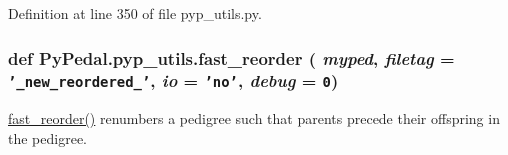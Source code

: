 Definition at line 350 of file pyp\_\-utils.py.\hypertarget{namespacePyPedal_1_1pyp__utils_2e16f737b56be8e4ab5ce5103a36644c}{
\subsubsection[fast\_\-reorder]{\setlength{\rightskip}{0pt plus 5cm}def Py\-Pedal.pyp\_\-utils.fast\_\-reorder ( {\em myped},  {\em filetag} = {\tt '\_\-new\_\-reordered\_\-'},  {\em io} = {\tt 'no'},  {\em debug} = {\tt 0})}}
\label{namespacePyPedal_1_1pyp__utils_2e16f737b56be8e4ab5ce5103a36644c}


\hyperlink{namespacePyPedal_1_1pyp__utils_2e16f737b56be8e4ab5ce5103a36644c}{fast\_\-reorder()} renumbers a pedigree such that parents precede their offspring in the pedigree. 

